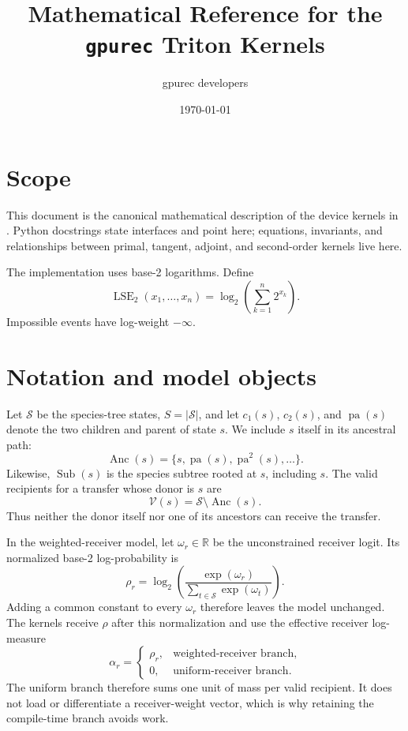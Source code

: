 \documentclass[11pt]{article}
\title{Mathematical Reference for the \texttt{gpurec} Triton Kernels}
\author{gpurec developers}
\date{\today}
\newcommand{\LSE}{\operatorname{LSE}_2}
\newcommand{\Anc}{\operatorname{Anc}}
\newcommand{\Sub}{\operatorname{Sub}}
\newcommand{\R}{\mathbb{R}}
\begin{document}
\maketitle
\tableofcontents

\section{Scope}

This document is the canonical mathematical description of the device kernels
in .  Python docstrings state interfaces and point
here; equations, invariants, and relationships between primal, tangent,
adjoint, and second-order kernels live here.

The implementation uses base-2 logarithms.  Define
\begin{equation}
  \LSE(x_1,\ldots,x_n)
  = \log_2\!\left(\sum_{k=1}^n 2^{x_k}\right).
  \label{eq:lse}
\end{equation}
Impossible events have log-weight $-\infty$.

\section{Notation and model objects}

Let $\mathcal S$ be the species-tree states, $S=|\mathcal S|$, and let
$c_1(s)$, $c_2(s)$, and $\operatorname{pa}(s)$ denote the two children and
parent of state $s$.  We include $s$ itself in its ancestral path:
\[
  \Anc(s)=\{s,\operatorname{pa}(s),\operatorname{pa}^2(s),\ldots\}.
\]
Likewise, $\Sub(s)$ is the species subtree rooted at $s$, including $s$.
The valid recipients for a transfer whose donor is $s$ are
\begin{equation}
  \mathcal V(s)=\mathcal S\setminus\Anc(s).
  \label{eq:valid-recipients}
\end{equation}
Thus neither the donor itself nor one of its ancestors can receive the
transfer.

In the weighted-receiver model, let $\omega_r\in\R$ be the unconstrained
receiver logit.  Its normalized base-2 log-probability is
\begin{equation}
  \rho_r=\log_2\!\left(
    \frac{\exp(\omega_r)}{\sum_{t\in\mathcal S}\exp(\omega_t)}
  \right).
  \label{eq:receiver-log-softmax}
\end{equation}
Adding a common constant to every $\omega_r$ therefore leaves the model
unchanged.  The kernels receive $\rho$ after this normalization and use the
effective receiver log-measure
\begin{equation}
  \alpha_r=
  \begin{cases}
    \rho_r,&\text{weighted-receiver branch},\\
    0,&\text{uniform-receiver branch}.
  \end{cases}
  \label{eq:receiver-measure}
\end{equation}
The uniform branch therefore sums one unit of mass per valid recipient.  It
does not load or differentiate a receiver-weight vector, which is why retaining
the compile-time branch avoids work.
\end{document}
